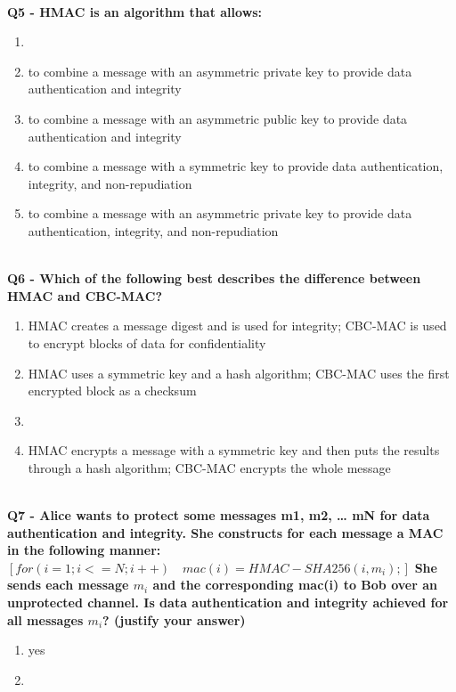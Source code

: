 \textbf{\\Q5 - HMAC is an algorithm that allows:}
\begin{enumerate}
	\item[A.] 
	\item[B.] to combine a message with an asymmetric private key to provide data authentication and integrity
	\item[C.] to combine a message with an asymmetric public key to provide data authentication and integrity
	\item[D.] to combine a message with a symmetric key to provide data authentication, integrity, and non-repudiation
	\item[E.] to combine a message with an asymmetric private key to provide data authentication, integrity, and non-repudiation
\end{enumerate}

\textbf{\\Q6 - Which of the following best describes the difference between HMAC and CBC-MAC?}
\begin{enumerate}
	\item[A.] HMAC creates a message digest and is used for integrity; CBC-MAC is used to encrypt blocks of data for confidentiality
	\item[B.] HMAC uses a symmetric key and a hash algorithm; CBC-MAC uses the first encrypted block as a checksum
	\item[C.] 
	\item[D.] HMAC encrypts a message with a symmetric key and then puts the results through a hash algorithm; CBC-MAC encrypts the whole message
\end{enumerate}

\textbf{\\Q7 - Alice wants to protect some messages m1, m2, … mN for data authentication and integrity. She constructs for each message a MAC in the following manner:}
\textbf{$[for (i=1; i<=N; i++) \quad mac(i) = HMAC-SHA256( i, m_{i} );]$}
\textbf{She sends each message $m_{i}$ and the corresponding mac(i)
	to Bob over an unprotected channel.
	Is data authentication and integrity achieved for all messages $m_{i}$? (justify your answer)}
\begin{enumerate}
	\item[A.] yes
	\item[B.] 
\end{enumerate}

